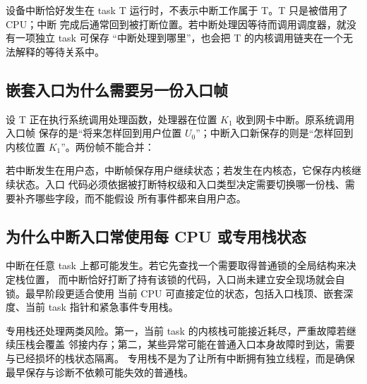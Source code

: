 设备中断恰好发生在 task T 运行时，不表示中断工作属于 T。T 只是被借用了 CPU；中断
完成后通常回到被打断位置。若中断处理因等待而调用调度器，就没有一项独立 task 可保存
“中断处理到哪里”，也会把 T 的内核调用链夹在一个无法解释的等待关系中。

\subsection{嵌套入口为什么需要另一份入口帧}

设 T 正在执行系统调用处理函数，处理器在位置 \(K_1\) 收到网卡中断。原系统调用入口帧
保存的是“将来怎样回到用户位置 \(U_0\)”；中断入口新保存的则是“怎样回到内核位置
\(K_1\)”。两份帧不能合并：

\begin{center}
\end{center}

若中断发生在用户态，中断帧保存用户继续状态；若发生在内核态，它保存内核继续状态。入口
代码必须依据被打断特权级和入口类型决定需要切换哪一份栈、需要补齐哪些字段，而不能假设
所有事件都来自用户态。

\subsection{为什么中断入口常使用每 CPU 或专用栈状态}

中断在任意 task 上都可能发生。若它先查找一个需要取得普通锁的全局结构来决定栈位置，
而中断恰好打断了持有该锁的代码，入口尚未建立安全现场就会自锁。最早阶段更适合使用
当前 CPU 可直接定位的状态，包括入口栈顶、嵌套深度、当前 task 指针和紧急事件专用栈。

专用栈还处理两类风险。第一，当前 task 的内核栈可能接近耗尽，严重故障若继续压栈会覆盖
邻接内存；第二，某些异常可能在普通入口本身故障时到达，需要与已经损坏的栈状态隔离。
专用栈不是为了让所有中断拥有独立线程，而是确保最早保存与诊断不依赖可能失效的普通栈。

